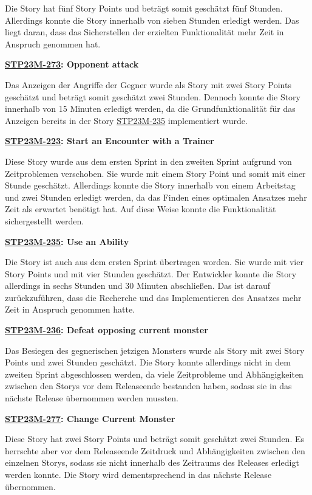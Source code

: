 Die Story hat fünf Story Points und beträgt somit geschätzt fünf Stunden. Allerdings konnte die Story innerhalb von sieben Stunden erledigt werden. Das liegt daran, dass das Sicherstellen der erzielten Funktionalität mehr Zeit in Anspruch genommen hat.

\textbf{\hyperlink{T273}{\hypertarget{S273}{STP23M-273}}: Opponent attack}

Das Anzeigen der Angriffe der Gegner wurde als Story mit zwei Story Points geschätzt und beträgt somit geschätzt zwei Stunden. Dennoch konnte die Story innerhalb von 15 Minuten erledigt werden, da die Grundfunktionalität für das Anzeigen bereits in der Story \hyperlink{T235}{\hypertarget{S235}{STP23M-235}} implementiert wurde.

\textbf{\hyperlink{T223}{\hypertarget{S223}{STP23M-223}}: Start an Encounter with a Trainer}

Diese Story wurde aus dem ersten Sprint in den zweiten Sprint aufgrund von Zeitproblemen verschoben. Sie wurde mit einem Story Point und somit mit einer Stunde geschätzt. Allerdings konnte die Story innerhalb von einem Arbeitstag und zwei Stunden erledigt werden, da das Finden eines optimalen Ansatzes mehr Zeit als erwartet benötigt hat. Auf diese Weise konnte die Funktionalität sichergestellt werden.  

\textbf{\hyperlink{T235}{\hypertarget{S235}{STP23M-235}}: Use an Ability}

Die Story ist auch aus dem ersten Sprint übertragen worden. Sie wurde mit vier Story Points und mit vier Stunden geschätzt. Der Entwickler konnte die Story allerdings in sechs Stunden und 30 Minuten abschließen. Das ist darauf zurückzuführen, dass die Recherche und das Implementieren des Ansatzes mehr Zeit in Anspruch genommen hatte. 

\textbf{\hyperlink{T236}{\hypertarget{S236}{STP23M-236}}: Defeat opposing current monster}

Das Besiegen des gegnerischen jetzigen Monsters wurde als Story mit zwei Story Points und zwei Stunden geschätzt. Die Story konnte allerdings nicht in dem zweiten Sprint abgeschlossen werden, da viele Zeitprobleme und Abhängigkeiten zwischen den Storys vor dem Releaseende bestanden haben, sodass sie in das nächste Release übernommen werden mussten.

\textbf{\hyperlink{T277}{\hypertarget{S277}{STP23M-277}}: Change Current Monster}

Diese Story hat zwei Story Points und beträgt somit geschätzt zwei Stunden. Es herrschte aber vor dem Releaseende Zeitdruck und Abhängigkeiten zwischen den einzelnen Storys, sodass sie nicht innerhalb des Zeitraums des Releases erledigt werden konnte. Die Story wird dementsprechend in das nächste Release übernommen.